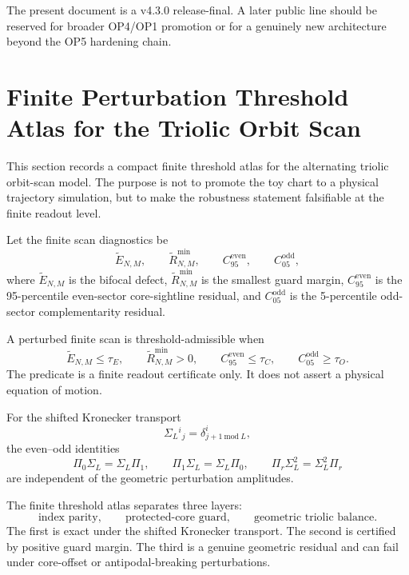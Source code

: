 \begin{remark}
The present document is a v4.3.0 release-final. A later public line should be reserved for broader OP4/OP1 promotion or for a genuinely new architecture beyond the OP5 hardening chain.
\end{remark}



\section{Finite Perturbation Threshold Atlas for the Triolic Orbit Scan}
\label{sec:finite-perturbation-threshold-atlas}

This section records a compact finite threshold atlas for the alternating
triolic orbit-scan model.  The purpose is not to promote the toy chart to a
physical trajectory simulation, but to make the robustness statement falsifiable
at the finite readout level.

Let the finite scan diagnostics be
\[
    \widetilde E_{N,M},\qquad
    \widetilde R_{N,M}^{\min},\qquad
    C_{95}^{\mathrm{even}},\qquad
    C_{05}^{\mathrm{odd}},
\]
where \(\widetilde E_{N,M}\) is the bifocal defect,
\(\widetilde R_{N,M}^{\min}\) is the smallest guard margin,
\(C_{95}^{\mathrm{even}}\) is the 95-percentile even-sector core-sightline
residual, and \(C_{05}^{\mathrm{odd}}\) is the 5-percentile odd-sector
complementarity residual.

\begin{definition}
A perturbed finite scan is threshold-admissible when
\[
    \widetilde E_{N,M}\leq \tau_E,\qquad
    \widetilde R_{N,M}^{\min}>0,\qquad
    C_{95}^{\mathrm{even}}\leq \tau_C,\qquad
    C_{05}^{\mathrm{odd}}\geq \tau_O.
\]
The predicate is a finite readout certificate only. It does not assert a
physical equation of motion.
\end{definition}

\begin{lemma}
For the shifted Kronecker transport
\[
    \Sigma_L{}^i{}_j=\delta^i_{j+1\ \mathrm{mod}\ L},
\]
the even--odd identities
\[
    \Pi_0\Sigma_L=\Sigma_L\Pi_1,\qquad
    \Pi_1\Sigma_L=\Sigma_L\Pi_0,\qquad
    \Pi_r\Sigma_L^2=\Sigma_L^2\Pi_r
\]
are independent of the geometric perturbation amplitudes.
\end{lemma}

\begin{proposition}
The finite threshold atlas separates three layers:
\[
\text{index parity},\qquad
\text{protected-core guard},\qquad
\text{geometric triolic balance}.
\]
The first is exact under the shifted Kronecker transport.  The second is
certified by positive guard margin.  The third is a genuine geometric residual
and can fail under core-offset or antipodal-breaking perturbations.
\end{proposition}

